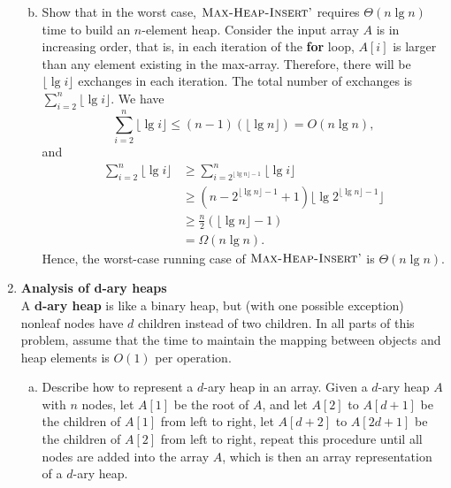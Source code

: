 \documentclass[12pt,reqno]{amsart}
\newif\ifanswer
\begin{document}
\begin{enumerate}[1.]
\begin{enumerate}[a.]
\begin{center}
    \end{center}
    \item Show that in the worst case, $\textsc{Max-Heap-Insert'}$ requires $\Theta(n\lg{n})$ time to build an $n$-element heap.
    \ifanswer
    \noindent {\bf \\Solution}
    Consider the input array $A$ is in increasing order, that is, in each iteration of the \textbf{for} loop, $A[i]$ is larger than any element existing in the max-array. Therefore, there will be $\lfloor \lg{i} \rfloor$ exchanges in each iteration. The total number of exchanges is $\sum_{i = 2}^{n}{\lfloor \lg{i} \rfloor}$. We have
    $$
    \sum_{i = 2}^{n}{\lfloor \lg{i} \rfloor} \leq (n - 1)(\lfloor \lg{n} \rfloor) = O(n\lg{n}),
    $$
    and
    \begin{align*}
    \sum_{i = 2}^{n}{\lfloor \lg{i} \rfloor} &\geq \sum_{i = 2^{\lfloor \lg{n} \rfloor - 1}}^{n}{\lfloor \lg{i} \rfloor}\\
    &\geq (n - 2^{\lfloor \lg{n} \rfloor - 1} + 1){\lfloor \lg{2^{\lfloor \lg{n} \rfloor - 1}} \rfloor}\\
    &\geq \frac{n}{2}(\lfloor \lg{n} \rfloor - 1)\\
    &= \Omega(n\lg{n}).
    \end{align*}
    Hence, the worst-case running case of $\textsc{Max-Heap-Insert'}$ is $\Theta(n\lg{n})$.
\end{enumerate}
\vspace{1cm}



\item \textbf{Analysis of d-ary heaps}\\ A \textbf{d-ary heap} is like a binary heap, but (with one possible exception) nonleaf nodes have $d$ children instead of two children. In all parts of this problem, assume that the time to maintain the mapping between objects and heap elements is $O(1)$ per operation.
\begin{enumerate}[a.]
    \item Describe how to represent a $d$-ary heap in an array.
    \ifanswer
    \noindent {\bf \\Solution}
    Given a $d$-ary heap $A$ with $n$ nodes, let $A[1]$ be the root of $A$, and let $A[2]$ to $A[d + 1]$ be the children of $A[1]$ from left to right, let $A[d + 2]$ to $A[2d + 1]$ be the children of $A[2]$ from left to right, repeat this procedure until all nodes are added into the array $A$, which is then an array representation of a $d$-ary heap.


\end{enumerate}
\end{enumerate}
\end{document}
